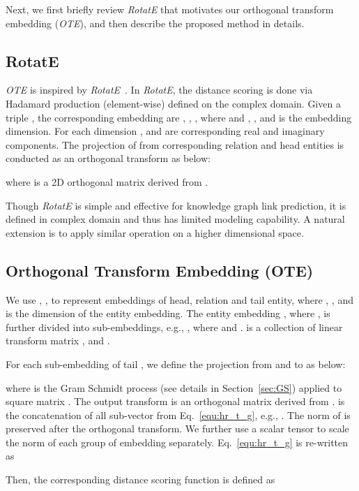\documentclass[11pt,a4paper]{article}
\begin{document}
Next, we first briefly review {\it RotatE} that motivates our orthogonal transform embedding ({\em OTE}), and then describe the proposed method in details.

\subsection{RotatE}
{\em OTE} is inspired by {\it RotatE}~\cite{Sun2019RotatEKG}.
In {\it RotatE}, the distance scoring is done via Hadamard production (element-wise) defined on the complex domain. Given a triple , the corresponding embedding are , , , where  and , ,  and  is the embedding dimension.  For each dimension ,  and  are corresponding real and imaginary components. The projection  of  from corresponding relation and head entities is conducted as an orthogonal transform as below:

where  is a 2D orthogonal matrix derived from  .

Though {\it RotatE} is simple and effective for knowledge graph link prediction, it is defined in  complex domain and thus has limited modeling capability. 
A natural extension is to apply similar operation on a higher dimensional space.



\subsection{Orthogonal Transform Embedding (OTE)} \label{sec:ote}
We use , ,  to represent embeddings of head, relation and tail entity, where , ,  and  is the dimension of the entity embedding. The entity embedding , where , is further divided into  sub-embeddings, e.g., , where  and .  is a collection of  linear transform matrix , and . 

For each sub-embedding  of tail , we define the projection from  and  to  as below:

where  is the Gram Schmidt process (see details in Section~\ref{sec:GS}) applied to square matrix . The output transform  is an orthogonal matrix derived from . 
 is the concatenation of all sub-vector  from Eq.~\ref{equ:hr_t_g}, e.g., . 
The  norm of  is preserved after the orthogonal transform.  We further use a scalar tensor  to scale the  norm of each group of embedding separately. Eq.~\ref{equ:hr_t_g} is re-written as


Then, the corresponding distance scoring function is defined as
\end{document}
